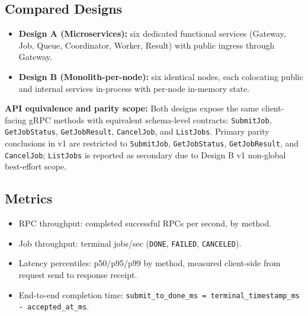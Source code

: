 \documentclass[11pt]{article}
\begin{document}
\subsection{Compared Designs}
\begin{itemize}
    \item \textbf{Design A (Microservices):} six dedicated functional services (Gateway, Job, Queue, Coordinator, Worker, Result) with public ingress through Gateway.
    \item \textbf{Design B (Monolith-per-node):} six identical nodes, each colocating public and internal services in-process with per-node in-memory state.
\end{itemize}

\noindent
\textbf{API equivalence and parity scope:}
Both designs expose the same client-facing gRPC methods with equivalent schema-level contracts:
\texttt{SubmitJob}, \texttt{GetJobStatus}, \texttt{GetJobResult}, \texttt{CancelJob}, and \texttt{ListJobs}.
Primary parity conclusions in v1 are restricted to \texttt{SubmitJob}, \texttt{GetJobStatus}, \texttt{GetJobResult}, and \texttt{CancelJob}; \texttt{ListJobs} is reported as secondary due to Design B v1 non-global best-effort scope.


\subsection{Metrics}
\begin{itemize}
    \item RPC throughput: completed successful RPCs per second, by method.
    \item Job throughput: terminal jobs/sec (\texttt{DONE}, \texttt{FAILED}, \texttt{CANCELED}).
    \item Latency percentiles: p50/p95/p99 by method, measured client-side from request send to response receipt.
    \item End-to-end completion time: \texttt{submit\_to\_done\_ms = terminal\_timestamp\_ms - accepted\_at\_ms}.
\end{itemize}
\end{document}
